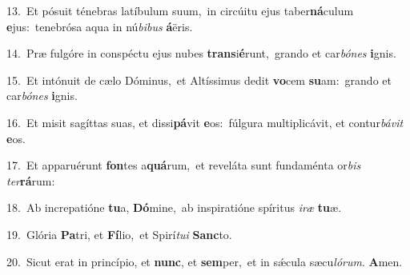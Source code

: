 {\numbfont\textcolor{\numbcolor}{13.}}~Et pósuit ténebras latíbulum suum,~\dagger in circúitu ejus taber\-\textbf{ná}\-culum \textbf{e}\-jus:~\star tenebrósa aqua in nú\-\textit{bi}\-\textit{bus} \textbf{á}\-ëris.\par
{\numbfont\textcolor{\numbcolor}{14.}}~Præ fulgóre in conspéctu ejus nubes \textbf{trans}\-i\-\textbf{é}\-runt,~\star grando et car\-\textit{bó}\-\textit{nes} \textbf{i}\-gnis.\par
{\numbfont\textcolor{\numbcolor}{15.}}~Et intónuit de cælo Dóminus,~\dagger et Altíssimus dedit \textbf{vo}\-cem \textbf{su}\-am:~\star grando et car\-\textit{bó}\-\textit{nes} \textbf{i}\-gnis.\par
{\numbfont\textcolor{\numbcolor}{16.}}~Et misit sagíttas suas, et dissi\-\textbf{pá}\-vit \textbf{e}\-os:~\star fúlgura multiplicávit, et contur\-\textit{bá}\-\textit{vit} \textbf{e}\-os.\par
{\numbfont\textcolor{\numbcolor}{17.}}~Et apparuérunt \textbf{fon}\-tes a\-\textbf{quá}\-rum,~\star et reveláta sunt fundaménta or\textit{bis} \textit{ter}\-\textbf{rá}rum:\par
{\numbfont\textcolor{\numbcolor}{18.}}~Ab increpatióne \textbf{tu}\-a, \textbf{Dó}\-mine,~\star ab inspiratióne spíritus \textit{i}\-\textit{ræ} \textbf{tu}\-æ.\par
{\numbfont\textcolor{\numbcolor}{19.}}~Glória \textbf{Pa}\-tri, et \textbf{Fí}\-lio,~\star et Spirí\-\textit{tu}\-\textit{i} \textbf{Sanc}\-to.\par
{\numbfont\textcolor{\numbcolor}{20.}}~Sicut erat in princípio, et \textbf{nunc}\-, et \textbf{sem}\-per,~\star et in sǽcula sæcu\-\textit{ló}\-\textit{rum}. \textbf{A}\-men.\par
